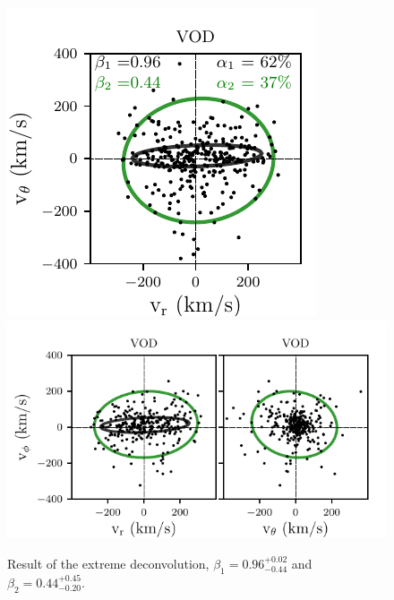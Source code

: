 \documentclass[fleqn,usenatbib]{mnras}
\begin{document}
\begin{figure}
    \includegraphics[scale=0.545]{VOD_velocities_vphi_gm2.pdf}
    \includegraphics[scale=0.545]{VOD_velocities_vtheta_gm2.pdf} 
   \caption{Result of the extreme deconvolution,  $\beta_{1}= 0.96^{+0.02}_{-0.44}$ and $\beta_{2}=0.44^{+0.45}_{-0.20}$. }
    \label{fig:xd}
\end{figure}
\end{document}

